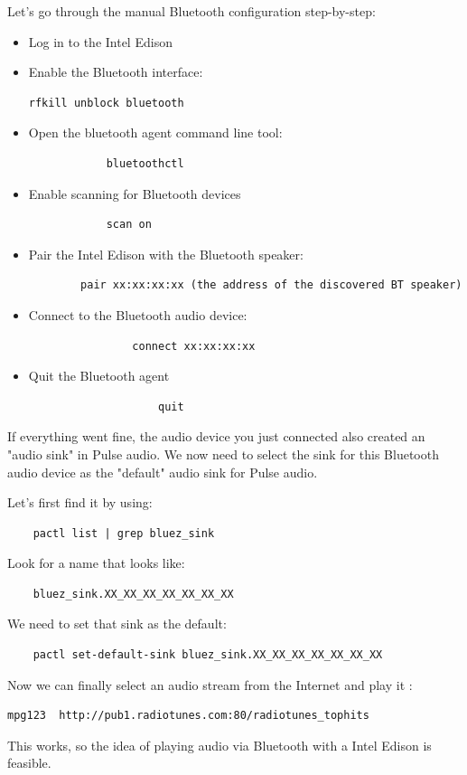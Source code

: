 \documentclass[12pt,a4paper]{scrreprt}
\begin{document}
Let's go through the manual Bluetooth configuration step-by-step:

\begin{itemize}
	\item Log in to the Intel Edison
	\item Enable the Bluetooth interface: 
	\begin{verbatim}
rfkill unblock bluetooth
	\end{verbatim}
		\item Open the bluetooth agent command line tool:
			\begin{verbatim}
			bluetoothctl
			\end{verbatim}
			\item Enable scanning for Bluetooth devices
			\begin{verbatim}
			scan on
			\end{verbatim}
			\item Pair the Intel Edison with the Bluetooth speaker:
			\begin{verbatim}
		pair xx:xx:xx:xx (the address of the discovered BT speaker)
			\end{verbatim}
				\item Connect to the Bluetooth audio device:
				\begin{verbatim}
				connect xx:xx:xx:xx 
				\end{verbatim}
					\item Quit the Bluetooth agent
					\begin{verbatim}
					quit
					\end{verbatim}	
\end{itemize}

If everything went fine, the audio device you just connected also created an "audio sink" in Pulse audio. We now need to select the sink for this Bluetooth audio device as the "default" audio sink for Pulse audio.

Let's first find it by using:
	\begin{verbatim}
	pactl list | grep bluez_sink
	\end{verbatim}
Look for a name that looks like:
	\begin{verbatim}
	bluez_sink.XX_XX_XX_XX_XX_XX_XX
	\end{verbatim}
We need to set that sink as the default:
	\begin{verbatim}
	pactl set-default-sink bluez_sink.XX_XX_XX_XX_XX_XX_XX 
	\end{verbatim}
Now we can finally select an audio stream from the Internet and play it :
	\begin{verbatim}
mpg123  http://pub1.radiotunes.com:80/radiotunes_tophits
	\end{verbatim}
This works, so the idea of playing audio via Bluetooth with a Intel Edison is feasible.
\end{document}
